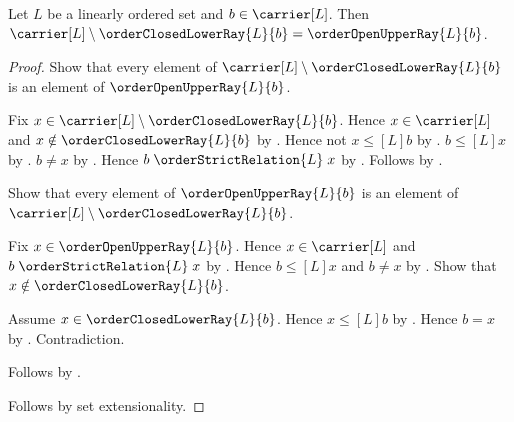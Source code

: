 \begin{proposition}\label{order_complement_closed_lower_ray}
    Let $L$ be a linearly ordered set and $b\in\carrier[L]$.
    Then $\carrier[L]\setminus\orderClosedLowerRay{L}{b}
        =\orderOpenUpperRay{L}{b}$.
\end{proposition}
\begin{proof}
    Show that every element of
        $\carrier[L]\setminus\orderClosedLowerRay{L}{b}$ is an element
        of $\orderOpenUpperRay{L}{b}$.
    \begin{subproof}
        Fix $x\in\carrier[L]\setminus\orderClosedLowerRay{L}{b}$.
        Hence $x\in\carrier[L]$ and
            $x\notin\orderClosedLowerRay{L}{b}$ by .
        Hence not $x\mathrel{\leq[L]}b$ by
            .
        $b\mathrel{\leq[L]}x$ by
            .
        $b\neq x$ by
            .
        Hence $b\mathrel{\orderStrictRelation{L}}x$ by
            .
        Follows by .
    \end{subproof}
    Show that every element of $\orderOpenUpperRay{L}{b}$ is an element
        of $\carrier[L]\setminus\orderClosedLowerRay{L}{b}$.
    \begin{subproof}
        Fix $x\in\orderOpenUpperRay{L}{b}$.
        Hence $x\in\carrier[L]$ and
            $b\mathrel{\orderStrictRelation{L}}x$ by
            .
        Hence $b\mathrel{\leq[L]}x$ and $b\neq x$ by
            .
        Show that $x\notin\orderClosedLowerRay{L}{b}$.
        \begin{subproof}
            Assume $x\in\orderClosedLowerRay{L}{b}$.
            Hence $x\mathrel{\leq[L]}b$ by
                .
            Hence $b=x$ by
                .
            Contradiction.
        \end{subproof}
        Follows by .
    \end{subproof}
    Follows by set extensionality.
\end{proof}

